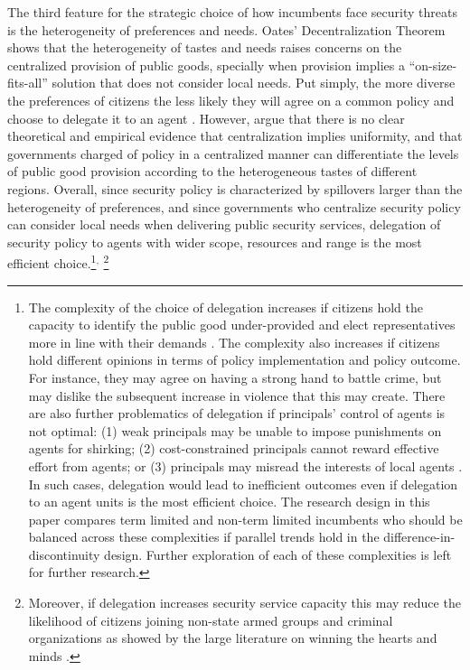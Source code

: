 \documentclass[12pt]{amsart}
\numberwithin{equation}{section}
\theoremstyle{definition}
\theoremstyle{definition}
\theoremstyle{definition}
\begin{document}
The third feature for the strategic choice of how incumbents face security threats is the heterogeneity of preferences and needs. Oates' \citeyear{oates_1972} Decentralization Theorem shows that the heterogeneity of tastes and needs raises concerns on the centralized provision of public goods, specially when provision implies a ``on-size-fits-all'' solution that does not consider local needs. Put simply, the more diverse the preferences of citizens the less likely they will agree on a common policy and choose to delegate it to an agent \citep{martin_2006, lyne_etal_2006}. However, \citet{besley_coate_2003} argue that there is no clear theoretical and empirical evidence that centralization implies uniformity, and that governments charged of policy in a centralized manner can differentiate the levels of public good provision according to the heterogeneous tastes of different regions. Overall, since security policy is characterized by  spillovers larger than the heterogeneity of preferences, and since governments who centralize security policy can consider local needs when delivering public security services, delegation of security policy to agents with wider scope, resources and range is the most efficient choice.\footnote{The complexity of the choice of delegation increases if citizens hold the capacity to identify the public good under-provided and elect representatives more in line with their demands \citet{besley_coate_2003}. The complexity also increases if citizens hold different opinions in terms of policy implementation and policy outcome. For instance, they may agree on having a strong hand to battle crime, but may dislike the subsequent increase in violence that this may create. There are also further problematics of delegation if principals' control of agents is not optimal: (1) weak principals may be unable to impose punishments on agents for shirking; (2) cost-constrained principals cannot reward effective effort from agents; or (3) principals may misread the interests of local agents \citep{berman_lake_2019}. In such cases, delegation would lead to inefficient outcomes even if delegation to an agent units is the most efficient choice. The research design in this paper compares term limited and non-term limited incumbents who should be balanced across these complexities if parallel trends hold in the difference-in-discontinuity design. Further exploration of each of these complexities is left for further research.}$^,$ \footnote{Moreover, if delegation increases security service capacity this may reduce the likelihood of citizens joining non-state armed groups and criminal organizations as showed by the large literature on winning the hearts and minds \citep{beath_etal_2013, berman_etal_2011, dell_querubin_2018}.} 
\end{document}

